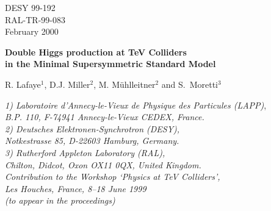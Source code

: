 \begin{flushright}
DESY 99-192\\
RAL-TR-99-083\\
February 2000
\end{flushright}
\vskip1.0cm
\begin{center}{\Large\bf
Double Higgs production at TeV Colliders\\[0.35cm]
in the Minimal Supersymmetric Standard Model}
\end{center}
\vskip0.75cm
\begin{center}{\large
R. Lafaye$^1$, 
D.J. Miller$^2$, M. M\"uhlleitner$^2$ and  S.~Moretti$^3$}%
\end{center}
\vskip0.5cm
\begin{center}{
{\it 1) Laboratoire d'Annecy-le-Vieux de Physique des Particules (LAPP)},\\
{\it B.P. 110, F-74941 Annecy-le-Vieux CEDEX, France.}\\[0.35cm]
{\it 2) Deutsches Elektronen-Synchrotron (DESY),}\\
{\it Notkestrasse 85, D-22603 Hamburg, Germany.}\\[0.35cm]
{\it 3) Rutherford Appleton Laboratory (RAL),}\\
{\it Chilton, Didcot, Oxon OX11 0QX, United Kingdom.}\\[1.0cm]
{\sl Contribution to the Workshop `Physics at TeV Colliders',}\\
{\sl Les Houches, France, 8--18 June 1999}\\
{\sl (to appear in the proceedings)}\\
}
\end{center}

%
%

